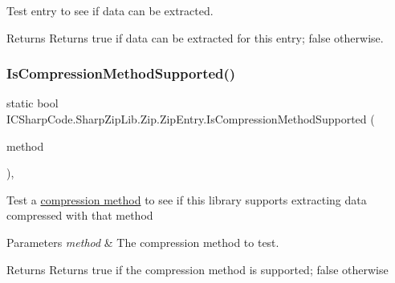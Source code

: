 Test entry to see if data can be extracted. 

\begin{DoxyReturn}{Returns}
Returns true if data can be extracted for this entry; false otherwise.
\end{DoxyReturn}
\mbox{\label{class_i_c_sharp_code_1_1_sharp_zip_lib_1_1_zip_1_1_zip_entry_ad464679f6e18df0d48a71dbc47fa1ac5}} 
\subsubsection{\texorpdfstring{Is\+Compression\+Method\+Supported()}{IsCompressionMethodSupported()}\hspace{0.1cm}{\footnotesize\ttfamily [2/4]}}
{\footnotesize\ttfamily static bool I\+C\+Sharp\+Code.\+Sharp\+Zip\+Lib.\+Zip.\+Zip\+Entry.\+Is\+Compression\+Method\+Supported (\begin{DoxyParamCaption}\item[{\hyperlink{namespace_i_c_sharp_code_1_1_sharp_zip_lib_1_1_zip_a90a0e174eca72bf6b490bae40d83a09e}{Compression\+Method}}]{method }\end{DoxyParamCaption})\hspace{0.3cm}{\ttfamily [inline]}, {\ttfamily [static]}}



Test a \hyperlink{class_i_c_sharp_code_1_1_sharp_zip_lib_1_1_zip_1_1_zip_entry_a1c4996433278e904adf2b5a6fe8718c0}{compression method} to see if this library supports extracting data compressed with that method 


\begin{DoxyParams}{Parameters}
{\em method} & The compression method to test.\\
\hline
\end{DoxyParams}
\begin{DoxyReturn}{Returns}
Returns true if the compression method is supported; false otherwise
\end{DoxyReturn}
\mbox{\label{class_i_c_sharp_code_1_1_sharp_zip_lib_1_1_zip_1_1_zip_entry_a472828fa6521baf1ae8515b7b6753d16}} 
